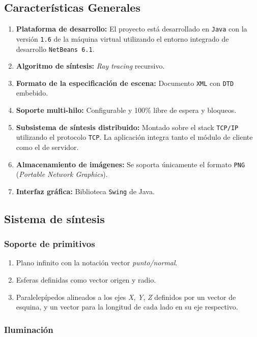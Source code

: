 \documentclass[]{article}
\begin{document}
\subsection{Características Generales}

\begin{enumerate}
 \item \textbf{Plataforma de desarrollo: } El proyecto está desarrollado en \texttt{Java} con la versión \texttt{1.6} de la máquina
 virtual utilizando el entorno integrado de desarrollo \texttt{NetBeans 6.1}.
 \item \textbf{Algoritmo de síntesis: }  \emph{Ray tracing} recursivo.
  \item \textbf{Formato de la especificación de escena: } Documento \texttt{XML} con \texttt{DTD} embebido.
 \item \textbf{Soporte multi-hilo: } Configurable y 100\% libre de espera y bloqueos.
 \item \textbf{Subsistema de síntesis distribuido: } Montado sobre el stack \texttt{TCP/IP} utilizando el protocolo \texttt{TCP}.
 La aplicación integra tanto el módulo de cliente como el de servidor.
 \item \textbf{Almacenamiento de imágenes: } Se soporta únicamente el formato \texttt{PNG} (\emph{Portable Network Graphics}).
 \item \textbf{Interfaz gráfica: } Biblioteca \texttt{Swing} de Java.
\end{enumerate}

\subsection{Sistema de síntesis}

\subsubsection{Soporte de primitivos}

\begin{enumerate}
 \item Plano infinito con la notación vector \emph{punto/normal}.
 \item Esferas definidas como vector origen y radio.
 \item Paralelepípedos alineados a los ejes \emph{X}, \emph{Y}, \emph{Z} definidos por un vector de esquina, y un vector 
 para la longitud de cada lado en su eje respectivo.
\end{enumerate}

\subsubsection{Iluminación}
\end{document}
